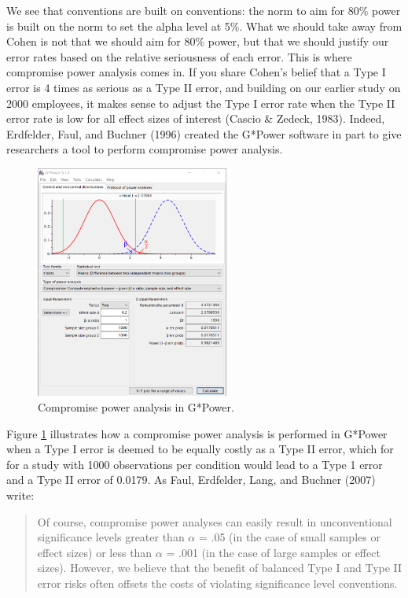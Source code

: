 \documentclass[
  english,
  ,jou, a4paper,floatsintext]{apa6}
\begin{document}
We see that conventions are built on conventions: the norm to aim for 80\% power is built on the norm to set the alpha level at 5\%. What we should take away from Cohen is not that we should aim for 80\% power, but that we should justify our error rates based on the relative seriousness of each error. This is where compromise power analysis comes in. If you share Cohen's belief that a Type I error is 4 times as serious as a Type II error, and building on our earlier study on 2000 employees, it makes sense to adjust the Type I error rate when the Type II error rate is low for all effect sizes of interest (Cascio \& Zedeck, 1983). Indeed, Erdfelder, Faul, and Buchner (1996) created the G*Power software in part to give researchers a tool to perform compromise power analysis.

\begin{figure}
\includegraphics[width=240px]{images/compromise1} \caption{Compromise power analysis in G*Power.}\label{fig:gpowcompromise}
\end{figure}

Figure \ref{fig:gpowcompromise} illustrates how a compromise power analysis is performed in G*Power when a Type I error is deemed to be equally costly as a Type II error, which for for a study with 1000 observations per condition would lead to a Type 1 error and a Type II error of 0.0179. As Faul, Erdfelder, Lang, and Buchner (2007) write:

\begin{quote}
Of course, compromise power analyses can easily result in unconventional significance levels greater than \(\alpha\) = .05 (in the case of small samples or effect sizes) or less than \(\alpha\) = .001 (in the case of large samples or effect sizes). However, we believe that the benefit of balanced Type I and Type II error risks often offsets the costs of violating significance level conventions.
\end{quote}
\end{document}
